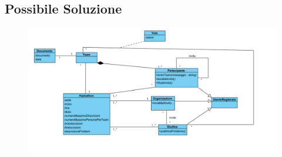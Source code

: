 \documentclass[a4paper, 15pt, oneside]{article}
\begin{document}
	\subsection{Possibile Soluzione}
	\begin{figure}[hb]
		\includegraphics[width=1\textwidth]{Immagini/PossibileSoluzioneHackathon}
	\end{figure}
	
\end{document}
